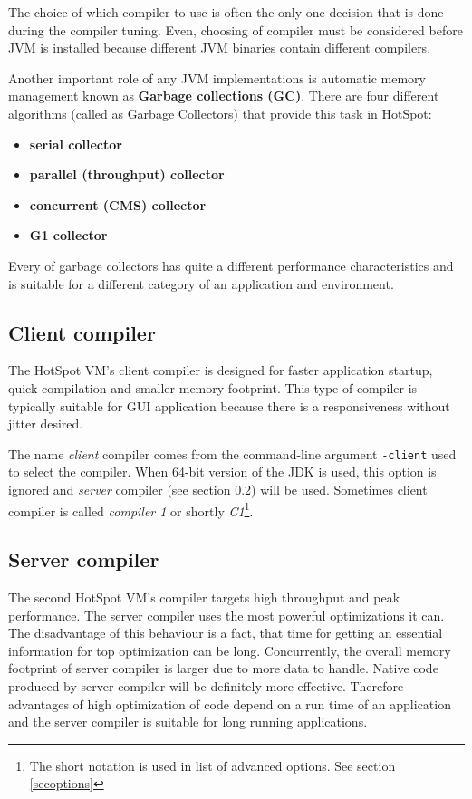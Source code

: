\documentclass[
  digital, %
  oneside,
  notable, %
  nolof,     %
  nolot     %
]{fithesis3}
\begin{document}
The choice of which compiler to use is often the only one decision that is done during the compiler tuning. Even, choosing of compiler must be considered before JVM is installed because different JVM binaries contain different compilers. \cite{scott}

Another important role of any JVM implementations is automatic memory management known as \textbf{Garbage collections (GC)}. There are four different algorithms (called as Garbage Collectors) that provide this task in HotSpot:
\begin{itemize}
	\item \textbf{serial collector}
	\item \textbf{parallel (throughput) collector}
	\item \textbf{concurrent (CMS) collector}
	\item \textbf{G1 collector}
\end{itemize}
Every of garbage collectors has quite a different performance characteristics and is suitable for a different category of an application and environment. \cite{scott}

\subsection{Client compiler}\label{clientcomp}
The HotSpot VM's client compiler is designed for faster application startup, quick compilation and smaller memory footprint. This type of compiler is typically suitable for GUI application because there is a responsiveness without jitter desired. \cite{hunt}

The name \textit{client} compiler comes from the command-line argument \texttt{-client} used to select the compiler. When 64-bit version of the JDK is used, this option is ignored and \textit{server} compiler (see section \ref{servercomp}) will be used. Sometimes client compiler is called \textit{compiler 1} or shortly \textit{C1}\footnote{The short notation is used in list of advanced options. See section \ref{secoptions}}. \cite{scott} \cite{java}
\subsection{Server compiler}\label{servercomp}
The second HotSpot VM's compiler targets high throughput and peak performance. The server compiler uses the most powerful optimizations it can. The disadvantage of this behaviour is a fact, that time for getting an essential information for top optimization can be long. Concurrently, the overall memory footprint of server compiler is larger due to more data to handle. Native code produced by server compiler will be definitely more effective. Therefore advantages of high optimization of code depend on a run time of an application and the server compiler is suitable for long running applications. \cite{hunt}
\end{document}
